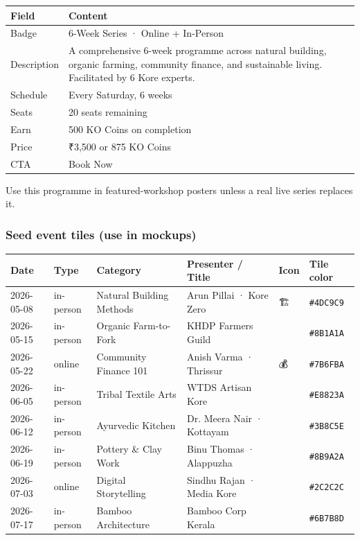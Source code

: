 \documentclass[11pt,a4paper]{report}
\begin{document}
\begin{longtable}{|l|l|}
\hline
Field & Content \\ \hline
Badge & 6-Week Series · Online + In-Person \\ \hline
Description & A comprehensive 6-week programme across natural building, organic farming, community finance, and sustainable living. Facilitated by 6 Kore experts. \\ \hline
Schedule & Every Saturday, 6 weeks \\ \hline
Seats & 20 seats remaining \\ \hline
Earn & 500 KO Coins on completion \\ \hline
Price & ₹3,500 or 875 KO Coins \\ \hline
CTA & Book Now \\
\hline
\end{longtable}


Use this programme in featured-workshop posters unless a real live series replaces it.


\subsubsection{Seed event tiles (use in mockups)}

\begin{longtable}{|l|l|l|l|l|l|}
\hline
Date & Type & Category & Presenter / Title & Icon & Tile color \\ \hline
2026-05-08 & in-person & Natural Building Methods & Arun Pillai · Kore Zero & 🏗️ & \texttt{\#4DC9C9} \\ \hline
2026-05-15 & in-person & Organic Farm-to-Fork & KHDP Farmers Guild & 🌾 & \texttt{\#8B1A1A} \\ \hline
2026-05-22 & online & Community Finance 101 & Anish Varma · Thrissur & 💰 & \texttt{\#7B6FBA} \\ \hline
2026-06-05 & in-person & Tribal Textile Arts & WTDS Artisan Kore & 🧵 & \texttt{\#E8823A} \\ \hline
2026-06-12 & in-person & Ayurvedic Kitchen & Dr. Meera Nair · Kottayam & 🌿 & \texttt{\#3B8C5E} \\ \hline
2026-06-19 & in-person & Pottery \& Clay Work & Binu Thomas · Alappuzha & 🏺 & \texttt{\#8B9A2A} \\ \hline
2026-07-03 & online & Digital Storytelling & Sindhu Rajan · Media Kore & 📱 & \texttt{\#2C2C2C} \\ \hline
2026-07-17 & in-person & Bamboo Architecture & Bamboo Corp Kerala & 🎋 & \texttt{\#6B7B8D} \\
\hline
\end{longtable}
\end{document}
